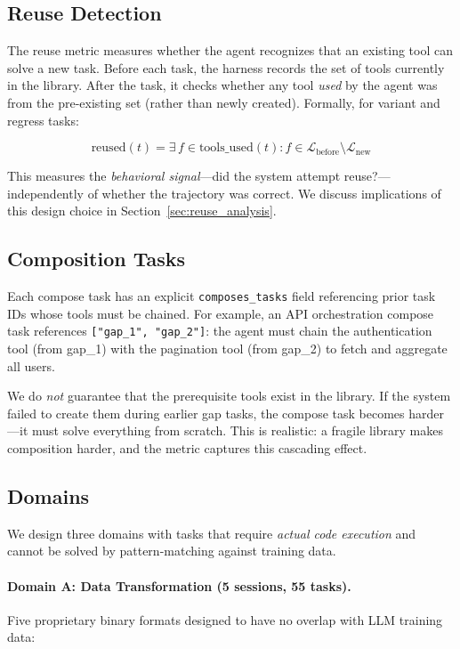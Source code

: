 \documentclass[10pt,twocolumn]{article}
\begin{document}
\subsection{Reuse Detection}
\label{sec:reuse}

The reuse metric measures whether the agent recognizes that an existing tool can solve a new task. Before each task, the harness records the set of tools currently in the library. After the task, it checks whether any tool \emph{used} by the agent was from the pre-existing set (rather than newly created). Formally, for variant and regress tasks:

\begin{equation}
\text{reused}(t) = \exists\, f \in \text{tools\_used}(t) : f \in \mathcal{L}_{\text{before}} \setminus \mathcal{L}_{\text{new}}
\end{equation}

This measures the \emph{behavioral signal}---did the system attempt reuse?---independently of whether the trajectory was correct. We discuss implications of this design choice in Section~\ref{sec:reuse_analysis}.

\subsection{Composition Tasks}
\label{sec:compose}

Each compose task has an explicit \texttt{composes\_tasks} field referencing prior task IDs whose tools must be chained. For example, an API orchestration compose task references \texttt{["gap\_1", "gap\_2"]}: the agent must chain the authentication tool (from gap\_1) with the pagination tool (from gap\_2) to fetch and aggregate all users.

We do \emph{not} guarantee that the prerequisite tools exist in the library. If the system failed to create them during earlier gap tasks, the compose task becomes harder---it must solve everything from scratch. This is realistic: a fragile library makes composition harder, and the metric captures this cascading effect.

\subsection{Domains}
\label{sec:domains}

We design three domains with tasks that require \emph{actual code execution} and cannot be solved by pattern-matching against training data.

\paragraph{Domain A: Data Transformation (5 sessions, 55 tasks).} Five proprietary binary formats designed to have no overlap with LLM training data:
\end{document}
